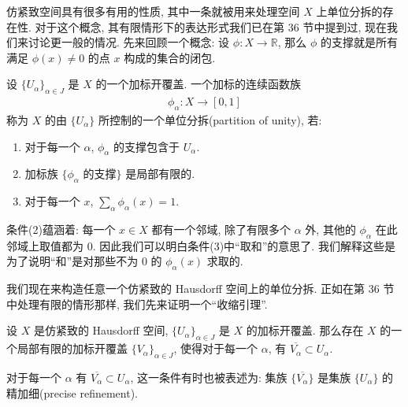 \documentclass[../../main.tex]{subfiles}
\begin{document}
仿紧致空间具有很多有用的性质, 其中一条就被用来处理空间 $X$ 上单位分拆的存在性. 对于这个概念, 其有限情形下的表达形式我们已在第 36 节中提到过, 现在我们来讨论更一般的情况. 先来回顾一个概念: 设 $\phi\colon X\to\mathbb{R}$, 那么 $\phi$ 的支撑就是所有满足 $\phi(x)\neq 0$ 的点 $x$ 构成的集合的闭包.

\begin{definition}\label{definition:ch06-partition-of-unity}
设 $\{U_\alpha\}_{\alpha\in J}$ 是 $X$ 的一个加标开覆盖. 一个加标的连续函数族
\begin{align*}
\phi_\alpha\colon X\longrightarrow[0,1]
\end{align*}
称为 $X$ 的由 $\{U_\alpha\}$ 所控制的一个单位分拆(partition of unity), 若:
\begin{enumerate}[(1)]
\item 对于每一个 $\alpha$, $\phi_\alpha$ 的支撑包含于 $U_\alpha$.
\item 加标族 $\{\phi_\alpha$ 的支撑$\}$ 是局部有限的.
\item 对于每一个 $x$, $\sum_\alpha\phi_\alpha(x)=1$.
\end{enumerate}
\end{definition}

条件(2)蕴涵着: 每一个 $x\in X$ 都有一个邻域, 除了有限多个 $\alpha$ 外, 其他的 $\phi_\alpha$ 在此邻域上取值都为 $0$. 因此我们可以明白条件(3)中``取和''的意思了. 我们解释这些是为了说明``和''是对那些不为 $0$ 的 $\phi_\alpha(x)$ 求取的.

我们现在来构造任意一个仿紧致的 Hausdorff 空间上的单位分拆. 正如在第 36 节中处理有限的情形那样, 我们先来证明一个``收缩引理''.

\begin{lemma}[收缩引理]\label{lemma:ch06-shrinking-lemma}
设 $X$ 是仿紧致的 Hausdorff 空间, $\{U_\alpha\}_{\alpha\in J}$ 是 $X$ 的加标开覆盖. 那么存在 $X$ 的一个局部有限的加标开覆盖 $\{V_\alpha\}_{\alpha\in J}$, 使得对于每一个 $\alpha$, 有 $\overline{V_\alpha}\subset U_\alpha$.
\end{lemma}

对于每一个 $\alpha$ 有 $\overline{V_\alpha}\subset U_\alpha$, 这一条件有时也被表述为: 集族 $\{\overline{V_\alpha}\}$ 是集族 $\{U_\alpha\}$ 的精加细(precise refinement).
\end{document}
